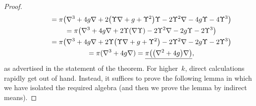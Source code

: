 \documentclass[pdftex]{sigma}
\begin{document}
\begin{proof}
\begin{gather*}
\hphantom{\underline{\pi\big(\hat\nabla^3\phi\big)}}{} = \pi\big(\nabla^3+4g\nabla+2\big(\Upsilon\nabla+g+\Upsilon^2\big)\Upsilon
-2\Upsilon^2\nabla-4g\Upsilon-4\Upsilon^3\big)\\
\hphantom{\underline{\pi\big(\hat\nabla^3\phi\big)}}{} = \pi\big(\nabla^3+4g\nabla+2\Upsilon(\nabla\Upsilon)
-2\Upsilon^2\nabla-2g\Upsilon-2\Upsilon^3\big)\\
\hphantom{\underline{\pi\big(\hat\nabla^3\phi\big)}}{} = \pi\big(\nabla^3+4g\nabla+2\Upsilon\big(\Upsilon\nabla+g+\Upsilon^2\big)
-2\Upsilon^2\nabla-2g\Upsilon-2\Upsilon^3\big)\\
\hphantom{\underline{\pi\big(\hat\nabla^3\phi\big)}}{} = \pi(\nabla^3+4g\nabla) =
\underline{\pi\big(\big(\nabla^2+4g\big)\nabla\big)},
\end{gather*}
as advertised in the statement of the theorem. For higher~$k$, direct
calculations rapidly get out of hand. Instead, it suf\/f\/ices to prove the
following lemma in which we have isolated the required algebra (and then we
prove the lemma by indirect means).
\end{proof}
\end{document}
